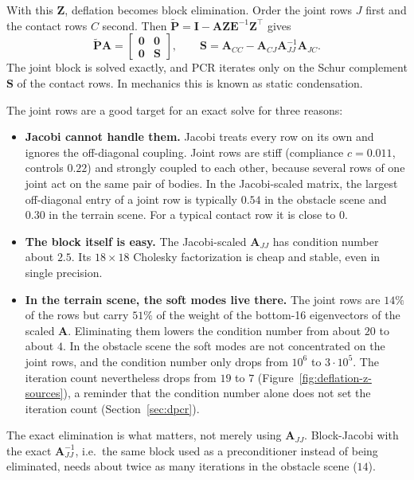 With this $\mathbf{Z}$, deflation becomes block elimination. Order the joint
rows $J$ first and the contact rows $C$ second. Then
$\tilde{\mathbf{P}} = \mathbf{I} - \mathbf{A}\mathbf{Z}\mathbf{E}^{-1}\mathbf{Z}^\top$
gives
\begin{equation}
  \tilde{\mathbf{P}}\mathbf{A} =
  \begin{bmatrix} \mathbf{0} & \mathbf{0} \\ \mathbf{0} & \mathbf{S} \end{bmatrix},
  \qquad
  \mathbf{S} = \mathbf{A}_{CC} - \mathbf{A}_{CJ}\mathbf{A}_{JJ}^{-1}\mathbf{A}_{JC} .
\end{equation}
The joint block is solved exactly, and PCR iterates only on the Schur
complement $\mathbf{S}$ of the contact rows. In mechanics this is known as
static condensation.

The joint rows are a good target for an exact solve for three reasons:
\begin{itemize}
  \item \textbf{Jacobi cannot handle them.} Jacobi treats every row on its
    own and ignores the off-diagonal coupling. Joint rows are stiff
    (compliance $c = 0.011$, controls $0.22$) and strongly coupled to each
    other, because several rows of one joint act on the same pair of
    bodies. In the Jacobi-scaled matrix, the largest off-diagonal entry of a
    joint row is typically $0.54$ in the obstacle scene and $0.30$ in the
    terrain scene. For a
    typical contact row it is close to $0$.
  \item \textbf{The block itself is easy.} The Jacobi-scaled
    $\mathbf{A}_{JJ}$ has condition number about $2.5$. Its $18 \times 18$
    Cholesky factorization is cheap and stable, even in single precision.
  \item \textbf{In the terrain scene, the soft modes live there.} The joint rows are
    $14\%$ of the rows but carry $51\%$ of the weight of the bottom-16
    eigenvectors of the scaled $\mathbf{A}$. Eliminating them lowers the
    condition number from about $20$ to about $4$. In the obstacle scene the soft modes
    are not concentrated on the joint rows, and the condition number only
    drops from $10^6$ to $3 \cdot 10^5$. The iteration count nevertheless
    drops from $19$ to $7$ (Figure~\ref{fig:deflation-z-sources}), a
    reminder that the condition number alone does not set the iteration
    count (Section~\ref{sec:dpcr}).
\end{itemize}
The exact elimination is what matters, not merely using $\mathbf{A}_{JJ}$.
Block-Jacobi with the exact $\mathbf{A}_{JJ}^{-1}$, i.e.\ the same block used
as a preconditioner instead of being eliminated, needs about twice as many
iterations in the obstacle scene ($14$).


